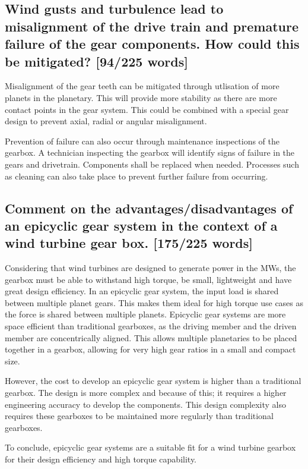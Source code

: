 \documentclass[12pt]{article}
\numberwithin{equation}{section}
\begin{document}
\begin{flushleft}
\subsection[Misalignment and failure prevention.]{Wind gusts and turbulence lead to misalignment of the drive train and premature failure of the gear components. How could this be mitigated? [94/225 words]}
Misalignment of the gear teeth can be mitigated through utlisation of more planets in the planetary. This will provide more stability as there are more contact points in the gear system. This could be combined with a special gear design to prevent axial, radial or angular misalignment. 

Prevention of failure can also occur through maintenance inspections of the gearbox. A technician inspecting the gearbox will identify signs of failure in the gears and drivetrain. Components shall be replaced when needed. Processes such as cleaning can also take place to prevent further failure from occurring.

\subsection[Advantages/disadvantages of an epicyclic gearbox.]{Comment on the advantages/disadvantages of an epicyclic gear system in the context of a wind turbine gear box. [175/225 words]}
Considering that wind turbines are designed to generate power in the MWs, the gearbox must be able to withstand high torque, be small, lightweight and have great design efficiency. In an epicyclic gear system, the input load is shared between multiple planet gears. This makes them ideal for high torque use cases as the force is shared between multiple planets. Epicyclic gear systems are more space efficient than traditional gearboxes, as the driving member and the driven member are concentrically aligned. This allows multiple planetaries to be placed together in a gearbox, allowing for very high gear ratios in a small and compact size.

However, the cost to develop an epicyclic gear system is higher than a traditional gearbox. The design is more complex and because of this; it requires a higher engineering accuracy to develop the components. This design complexity also requires these gearboxes to be maintained more regularly than traditional gearboxes.

To conclude, epicyclic gear systems are a suitable fit for a wind turbine gearbox for their design efficiency and high torque capability.


\end{flushleft}
\end{document}
